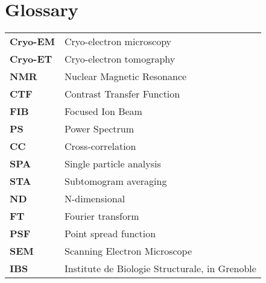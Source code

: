 \chapter{Glossary}


\begin{tabularx}{\linewidth}{@{}>{\bfseries}l X} %
Cryo-EM & Cryo-electron microscopy \\
Cryo-ET & Cryo-electron tomography \\
NMR & Nuclear Magnetic Resonance \\
CTF & Contrast Transfer Function \\
FIB & Focused Ion Beam \\
PS & Power Spectrum \\
CC & Cross-correlation \\
SPA & Single particle analysis \\
STA & Subtomogram averaging \\
ND & N-dimensional \\
FT & Fourier transform \\
PSF & Point spread function \\
SEM & Scanning Electron Microscope \\
IBS & Institute de Biologie Structurale, in Grenoble \\
\end{tabularx}

